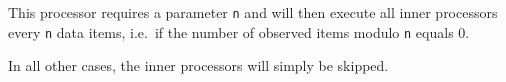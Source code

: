 
This processor requires a parameter \texttt{n} and will then execute all
inner processors every \texttt{n} data items, i.e.~if the number of
observed items modulo \texttt{n} equals 0.

In all other cases, the inner processors will simply be skipped.

\begin{table}[h]
\end{table}
